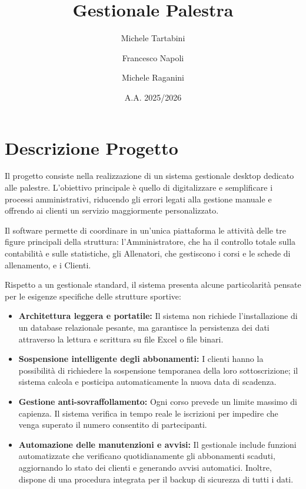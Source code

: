 \documentclass[12pt,a4paper]{report}
\title{Gestionale Palestra}
\author{Michele Tartabini \and Francesco Napoli \and Michele Raganini}
\date{A.A. 2025/2026}
\begin{document}
\maketitle
\tableofcontents
\newpage

\chapter{Descrizione Progetto}
\label{ch:descrizione}

Il progetto consiste nella realizzazione di un sistema gestionale desktop dedicato alle palestre. L'obiettivo principale è quello di digitalizzare e semplificare i processi amministrativi, riducendo gli errori legati alla gestione manuale e offrendo ai clienti un servizio maggiormente personalizzato.

Il software permette di coordinare in un'unica piattaforma le attività delle tre figure principali della struttura: l'Amministratore, che ha il controllo totale sulla contabilità e sulle statistiche, gli Allenatori, che gestiscono i corsi e le schede di allenamento, e i Clienti.

Rispetto a un gestionale standard, il sistema presenta alcune particolarità pensate per le esigenze specifiche delle strutture sportive:

\begin{itemize}
    \item \textbf{Architettura leggera e portatile:} Il sistema non richiede l'installazione di un database relazionale pesante, ma garantisce la persistenza dei dati attraverso la lettura e scrittura su file Excel o file binari.
    \item \textbf{Sospensione intelligente degli abbonamenti:} I clienti hanno la possibilità di richiedere la sospensione temporanea della loro sottoscrizione; il sistema calcola e posticipa automaticamente la nuova data di scadenza.
    \item \textbf{Gestione anti-sovraffollamento:} Ogni corso prevede un limite massimo di capienza. Il sistema verifica in tempo reale le iscrizioni per impedire che venga superato il numero consentito di partecipanti.
    \item \textbf{Automazione delle manutenzioni e avvisi:} Il gestionale include funzioni automatizzate che verificano quotidianamente gli abbonamenti scaduti, aggiornando lo stato dei clienti e generando avvisi automatici. Inoltre, dispone di una procedura integrata per il backup di sicurezza di tutti i dati.
\end{itemize}
\end{document}
